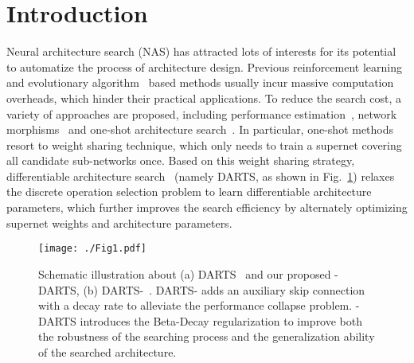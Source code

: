 \documentclass[10pt,twocolumn,letterpaper]{article}
\begin{document}
\section{Introduction} \label{sec:intro}
Neural architecture search (NAS) has attracted lots of interests for its potential to automatize the process of architecture design. Previous reinforcement learning~\cite{nasnet, mnasnet} and evolutionary algorithm~\cite{amoebanet} based methods usually incur massive computation overheads, which hinder their practical applications. To reduce the search cost, a variety of approaches are proposed, including performance estimation~\cite{klein2016learning}, network morphisms~\cite{cai2018path} and one-shot architecture search~\cite{spos,darts}. In particular, one-shot methods resort to weight sharing technique, which only needs to train a supernet covering all candidate sub-networks once. Based on this weight sharing strategy, differentiable architecture search~\cite{darts} (namely DARTS, as shown in Fig.~\ref{fig:1}) relaxes the discrete operation selection problem to learn differentiable architecture parameters, which further improves the search efficiency by alternately optimizing supernet weights and architecture parameters.

  \begin{figure}[t] 
	\centering
\texttt{[image: ./Fig1.pdf]}
\vspace{-12pt}
	\caption{ Schematic illustration about (a) DARTS~\cite{darts} and our proposed -DARTS, (b) DARTS-~\cite{darts-}.
	DARTS- adds an auxiliary skip connection with a decay rate 
to alleviate the performance collapse problem. -DARTS introduces the Beta-Decay regularization to improve both the robustness of the searching process and the generalization ability of the searched architecture.}
	\label{fig:1}
	\vspace{-12pt}	
\end{figure}
	
\end{document}
